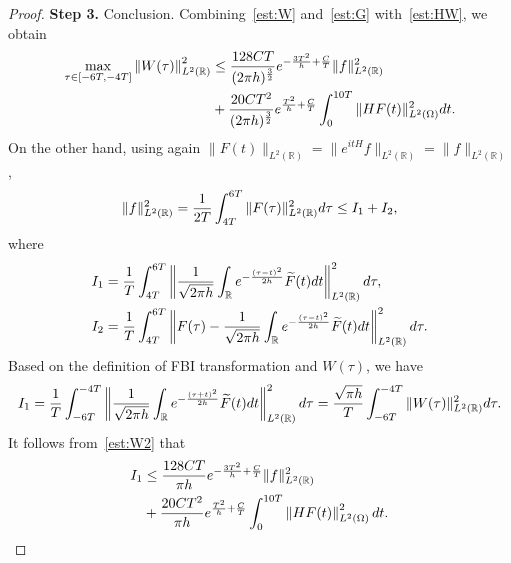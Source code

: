 \documentclass[a4paper,reqno]{amsart}
\theoremstyle{definition}
\numberwithin{equation}{section}
\newcommand{\R}{\mathbb{R}}
\def \R {{\mathbb{R} }}
\def \d {{\rm{d}}}
\begin{document}
\begin{proof}
    \textbf{Step 3.} Conclusion. Combining~\eqref{est:W} and~\eqref{est:G} with~\eqref{est:HW}, we obtain
    \begin{equation}\label{est:W2}
    \begin{aligned}
\max_{\tau \in [-6T,-4T]}\left\|W(\tau)\right\|_{L^{2}(\R)}^{2}
&\le\frac{128CT}{(2\pi h)^{\frac{3}{2}}}e^{-\frac{3T^{2}}{h}+\frac{C}{T}}\|f\|_{L^{2}(\R)}^{2}\\
&+\frac{20CT^{2}}{(2\pi h)^{\frac{3}{2}}}e^{\frac{T^{2}}{h}+\frac{C}{T}}\int_{0}^{10T}\|HF(t)\|_{L^{2}(\Omega)}^{2}\d t.
\end{aligned}
\end{equation}
On the other hand, using again $\|F(t)\|_{L^{2}(\R)}=\|e^{itH}f\|_{L^{2}(\R)}=\|f\|_{L^{2}(\R)}$,
\begin{equation*}
    \|f\|_{L^{2}(\R)}^{2}=\frac{1}{2T}\int_{4T}^{6T}\|F(\tau)\|_{L^{2}(\R)}^{2}\d \tau\le I_{1}+I_{2},
\end{equation*}
where 
\begin{equation*}
\begin{aligned}
    I_{1}&=\frac{1}{T}\int_{4T}^{6T}\left\|\frac{1}{\sqrt{2\pi h}}\int_{\R}e^{-\frac{(\tau-t)^{2}}{2h}}\widetilde{F}(t)\d t\right\|_{L^{2}(\R)}^{2}\d \tau,\\
    I_{2}&= \frac{1}{T}\int_{4T}^{6T}\left\|F(\tau)
    -\frac{1}{\sqrt{2\pi h}}\int_{\R}e^{-\frac{(\tau-t)^{2}}{2h}}\widetilde{F}(t)\d t    \right\|_{L^{2}(\R)}^{2}\d \tau.
    \end{aligned}
    \end{equation*}
    Based on the definition of FBI transformation and $W(\tau)$, we have 
    \begin{equation*}
        I_{1}=\frac{1}{T}\int_{-6T}^{-4T}\left\|\frac{1}{\sqrt{2\pi h}}\int_{\R}e^{-\frac{(\tau+t)^{2}}{2h}}\widetilde{F}(t)\d t\right\|_{L^{2}(\R)}^{2}\d \tau=\frac{\sqrt{\pi h}}{T}\int_{-6T}^{-4T}\|W(\tau)\|_{L^{2}(\R)}^{2}\d \tau.
        \end{equation*}
        It follows from~\eqref{est:W2} that 
        \begin{equation}\label{est:I1}
        \begin{aligned}
            I_{1}
            &\le \frac{128CT}{{\pi h}}e^{-\frac{3T^{2}}{h}+\frac{C}{T}}\|f\|_{L^{2}(\R)}^{2}\\     &+\frac{20CT^{2}}{\pi h}e^{\frac{T^{2}}{h}+\frac{C}{T}}          \int_{0}^{10T}\left\|HF(t)\right\|_{L^{2}(\Omega)}^{2}\d t.
            \end{aligned}
        \end{equation}

\end{proof}
\end{document}

